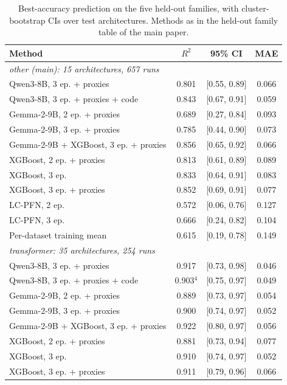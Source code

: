 \begin{table}[t]
\centering
\scriptsize
\caption{Best-accuracy prediction on the five held-out families, with cluster-bootstrap CIs over test architectures. Methods as in the held-out family table of the main paper.}
\label{tab:folds-full}
\begin{tabular}{lccc}
\toprule
Method & $R^2$ & 95\% CI & MAE \\
\midrule
\multicolumn{4}{l}{\textit{other (main): 15 architectures, 657 runs}} \\
\quad Qwen3-8B, 3 ep. + proxies & 0.801 & [0.55, 0.89] & 0.066 \\
\quad Qwen3-8B, 3 ep. + proxies + code & 0.843 & [0.67, 0.91] & 0.059 \\
\quad Gemma-2-9B, 2 ep. + proxies & 0.689 & [0.27, 0.84] & 0.093 \\
\quad Gemma-2-9B, 3 ep. + proxies & 0.785 & [0.44, 0.90] & 0.073 \\
\quad Gemma-2-9B + XGBoost, 3 ep. + proxies & 0.856 & [0.65, 0.92] & 0.066 \\
\quad XGBoost, 2 ep. + proxies & 0.813 & [0.61, 0.89] & 0.089 \\
\quad XGBoost, 3 ep. & 0.833 & [0.64, 0.91] & 0.083 \\
\quad XGBoost, 3 ep. + proxies & 0.852 & [0.69, 0.91] & 0.077 \\
\quad LC-PFN, 2 ep. & 0.572 & [0.06, 0.76] & 0.127 \\
\quad LC-PFN, 3 ep. & 0.666 & [0.24, 0.82] & 0.104 \\
\quad Per-dataset training mean & 0.615 & [0.19, 0.78] & 0.149 \\
\midrule
\multicolumn{4}{l}{\textit{transformer: 35 architectures, 254 runs}} \\
\quad Qwen3-8B, 3 ep. + proxies & 0.917 & [0.73, 0.98] & 0.046 \\
\quad Qwen3-8B, 3 ep. + proxies + code & 0.903$^{4}$ & [0.75, 0.97] & 0.049 \\
\quad Gemma-2-9B, 2 ep. + proxies & 0.889 & [0.73, 0.97] & 0.054 \\
\quad Gemma-2-9B, 3 ep. + proxies & 0.900 & [0.74, 0.97] & 0.052 \\
\quad Gemma-2-9B + XGBoost, 3 ep. + proxies & 0.922 & [0.80, 0.97] & 0.056 \\
\quad XGBoost, 2 ep. + proxies & 0.881 & [0.73, 0.94] & 0.077 \\
\quad XGBoost, 3 ep. & 0.910 & [0.74, 0.97] & 0.052 \\
\quad XGBoost, 3 ep. + proxies & 0.911 & [0.79, 0.96] & 0.066 \\

\end{tabular}
\end{table}
